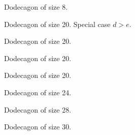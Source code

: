 \documentclass[11pt]{article}
\begin{document}
\begin{figure}[H]
\centering
{}
\caption{Dodecagon of size 8.}
\end{figure}

\begin{figure}[H]
\centering
{}
\caption{Dodecagon of size 20. Special case $d > e$.}
\end{figure}

\begin{figure}[H]
\centering
{}
\caption{Dodecagon of size 20.}
\end{figure}

\begin{figure}[H]
\centering
{}
\caption{Dodecagon of size 20.}
\end{figure}

\begin{figure}[H]
\centering
{}
\caption{Dodecagon of size 20.}
\end{figure}

\begin{figure}[H]
\centering
{}
\caption{Dodecagon of size 24.}
\end{figure}

\begin{figure}[H]
\centering
{}
\caption{Dodecagon of size 28.}
\end{figure}

\begin{figure}[H]
\centering
{}
\caption{Dodecagon of size 30.}
\end{figure}
\end{document}

